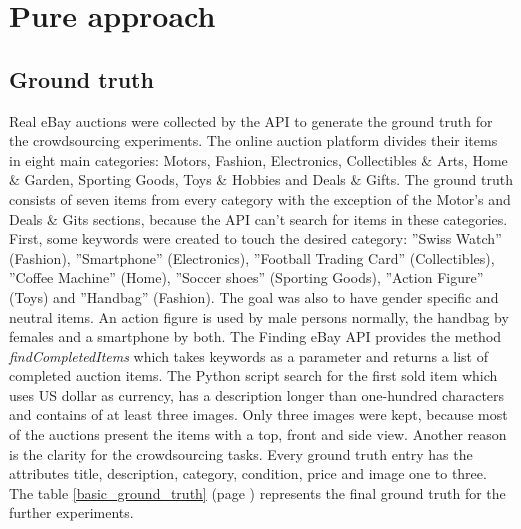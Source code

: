 \section{Pure approach}

\subsection{Ground truth}
\label{ground_truth}
Real eBay auctions were collected by the API to generate the ground truth for the crowdsourcing experiments. The online auction platform divides their items in eight main categories: Motors, Fashion, Electronics, Collectibles \& Arts, Home \& Garden, Sporting Goods, Toys \& Hobbies and Deals \& Gifts. The ground truth consists of seven items from every category with the exception of the Motor's and Deals \& Gits sections, because the API can't search for items in these categories. First, some keywords were created to touch the desired category: ''Swiss Watch'' (Fashion), ''Smartphone'' (Electronics), ''Football Trading Card'' (Collectibles), ''Coffee Machine'' (Home), ''Soccer shoes'' (Sporting Goods), ''Action Figure'' (Toys) and ''Handbag'' (Fashion). The goal was also to have gender specific and neutral items. An action figure is used by male persons normally, the handbag by females and a smartphone by both. The Finding eBay API provides the method \textit{findCompletedItems} which takes keywords as a parameter and returns a list of completed auction items. The Python script search for the first sold item which uses US dollar as currency, has a description longer than one-hundred characters and contains of at least three images. Only three images were kept, because most of the auctions present the items with a top, front and side view. Another reason is the clarity for the crowdsourcing tasks. Every ground truth entry has the attributes title, description, category, condition, price and image one to three. The table \ref{basic_ground_truth} (page \pageref{basic_ground_truth}) represents the final ground truth for the further experiments.

